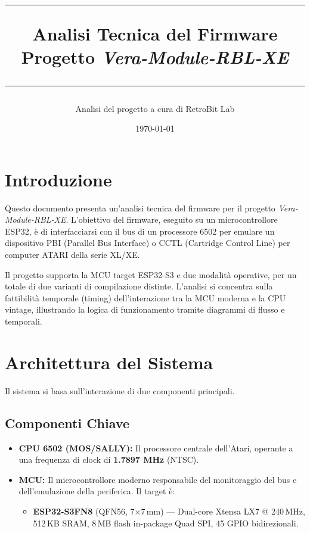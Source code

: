 \documentclass[12pt, a4paper]{article}
\title{
    \vspace{2cm}
    \hrule
    \vspace{0.5cm}
    {\Huge \bfseries Analisi Tecnica del Firmware}\\
    \vspace{0.2cm}
    {\Large Progetto \textit{Vera-Module-RBL-XE}}\\
    \vspace{0.5cm}
    \hrule
}
\author{Analisi del progetto a cura di RetroBit Lab}
\date{\today}
\begin{document}
\maketitle
\thispagestyle{empty}

\newpage
\tableofcontents
\thispagestyle{empty}

\newpage
\setcounter{page}{1}

\section{Introduzione}
Questo documento presenta un'analisi tecnica del firmware per il progetto \textit{Vera-Module-RBL-XE}. L'obiettivo del firmware, eseguito su un microcontrollore ESP32, è di interfacciarsi con il bus di un processore 6502 per emulare un dispositivo PBI (Parallel Bus Interface) o CCTL (Cartridge Control Line) per computer ATARI della serie XL/XE.

Il progetto supporta la MCU target ESP32-S3 e due modalità operative, per un totale di due varianti di compilazione distinte. L'analisi si concentra sulla fattibilità temporale (timing) dell'interazione tra la MCU moderna e la CPU vintage, illustrando la logica di funzionamento tramite diagrammi di flusso e temporali.

\section{Architettura del Sistema}
Il sistema si basa sull'interazione di due componenti principali.

\subsection{Componenti Chiave}
\begin{itemize}
    \item {\bfseries CPU 6502 (MOS/SALLY):} Il processore centrale dell'Atari, operante a una frequenza di clock di \textbf{1.7897 MHz} (NTSC).
    \item {\bfseries MCU:} Il microcontrollore moderno responsabile del monitoraggio del bus e dell'emulazione della periferica. Il target è:
    \begin{itemize}
        \item \textbf{ESP32-S3FN8} (QFN56, 7$\times$7\,mm) — Dual-core Xtensa LX7 @ 240\,MHz, 512\,KB SRAM, 8\,MB flash in-package Quad SPI, 45 GPIO bidirezionali.
    \end{itemize}
\end{itemize}
\end{document}
